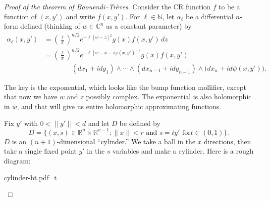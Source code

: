 \documentclass[12pt,openany]{book}
\newcommand{\snorm}[1]{\lVert {#1} \rVert}
\newcommand{\C}{{\mathbb{C}}}
\newcommand{\R}{{\mathbb{R}}}
\newcommand{\N}{{\mathbb{N}}}
\theoremstyle{plain}
\theoremstyle{remark}
\theoremstyle{definition}
\newenvironment{myfig}{%
    \begin{center}
}{%
    \end{center}
}
\theoremstyle{exercise}
\theoremstyle{example}
\begin{document}
\begin{proof}[Proof of the theorem of Baouendi--Tr{\`e}ves]
Consider the CR function $f$ to be a function of $(x,y')$
and write $f(x,y')$.
For $\ell \in \N$,
let $\alpha_{\ell}$ be a differential $n$-form defined (thinking
of $w \in \C^n$ as a constant parameter) by
\begin{equation*}
\begin{split}
\alpha_{\ell}(x,y')
& =
{\left(\frac{\ell}{\pi}\right)}^{n/2}
e^{-\ell [w - z]^2} g(x) f(x,y')
\,
dz
\\
& =
{\left(\frac{\ell}{\pi}\right)}^{n/2}
e^{-\ell [w - x-i\varphi(x,y')]^2} g(x) f(x,y')
\\
& \qquad \qquad
(dx_1 + idy_1)  \wedge
\cdots \wedge
(dx_{n-1} + i dy_{n-1})
\wedge
\bigl(dx_{n} + i d \psi (x,y') \bigr) .
\end{split}
\end{equation*}

The key is the exponential, which looks like the bump function
mollifier, except that now we have $w$ and $z$
possibly complex.  The exponential is also holomorphic in $w$, and that will
give us entire holomorphic approximating functions.

Fix $y'$ with $0 < \snorm{y'} < d$ and let $D$ be defined by
\begin{equation*}
D = \bigl\{ (x,s) \in \R^n \times \R^{n-1} : \snorm{x} < r \text{ and } s = t y' \text{ for
$t \in (0,1)$} \bigr\} .
\end{equation*}
$D$ is an $(n+1)$-dimensional ``cylinder.''  We take a ball in the
$x$ directions, then take a single fixed point $y'$ in the $s$ variables and make a
cylinder.  Here is a rough diagram:

\begin{myfig}
{cylinder-bt.pdf_t}
\end{myfig}


\end{proof}
\end{document}
